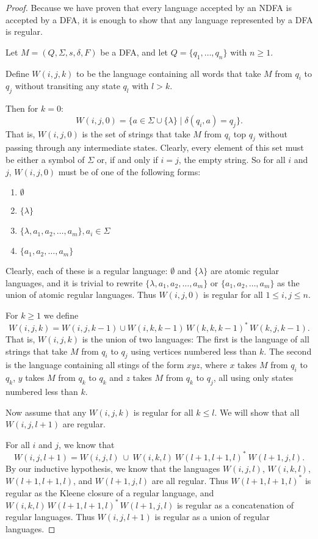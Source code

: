 \documentclass{bcthesis}
\begin{document}
	\begin{proof}
		Because we have proven that every language accepted by an NDFA is accepted by a DFA, it is enough to show that any language represented by a DFA is regular.

		Let $M = (Q, \Sigma, s, \delta, F)$ be a DFA, and let $Q = \{ q_1, \dots, q_n \}$ with $n \geq 1$.

		Define $W(i, j, k)$ to be the language containing all words that take $M$ from $q_i$ to $q_j$ without transiting any state $q_l$ with $l > k$.

		Then for $k = 0$:
		\[
			W(i, j, 0) = \{ a \in \Sigma \cup \{ \lambda \} \mid \delta(q_i, a) = q_j \}.
		\]
		That is, $W(i, j, 0)$ is the set of strings that take $M$ from $q_i$ top $q_j$ without passing through any intermediate states.
		Clearly, every element of this set must be either a symbol of $\Sigma$ or, if and only if $i = j$, the empty string.
		So for all $i$ and $j$, $W(i, j, 0)$ must be of one of the following forms:
		\begin{enumerate}[label=(\roman*), itemsep = -0.3 ex, nolistsep]
			\item $\emptyset$
			\item $\{ \lambda \}$
			\item $\{ \lambda, a_1, a_2, \dots, a_m \}, a_i \in \Sigma$
			\item $\{ a_1, a_2, \dots, a_m \}$
		\end{enumerate}
		Clearly, each of these is a regular language:
		$\emptyset$ and $\{ \lambda \}$ are atomic regular languages, and it is trivial to rewrite $\{ \lambda, a_1, a_2, \dots, a_m \}$ or $\{ a_1, a_2, \dots, a_m \}$ as the union of atomic regular languages.
		Thus $W(i, j, 0)$ is regular for all $1 \leq i, j \leq n$.

		For $k \geq 1$ we define
		\[
			W(i, j, k) = W(i, j, k-1) \cup W(i, k, k-1)\, W(k, k, k-1)^*\, W(k, j, k-1).
		\]
		That is, $W(i, j, k)$ is the union of two languages:
		The first is the language of all strings that take $M$ from $q_i$ to $q_j$ using vertices numbered less than $k$.
		The second is the language containing all stings of the form $xyz$, where $x$ takes $M$ from $q_i$ to $q_k$, $y$ takes $M$ from $q_k$ to $q_k$ and $z$ takes $M$ from $q_k$ to $q_j$, all using only states numbered less than $k$.

		Now assume that any $W(i, j, k)$ is regular for all $k \leq l$.
		We will show that all $W(i, j, l+1)$ are regular.

		For all $i$ and $j$, we know that 
		\[
			W(i, j, l+1) = W(i, j, l) \ \cup \ W(i, k, l)\ W(l+1, l+1, l)^* \ W(l+1, j, l).
		\]
		By our inductive hypothesis, we know that the languages $W(i, j, l)$, $W(i, k, l)$, $W(l+1, l+1, l)$, and $W(l+1, j, l)$ are all regular.
		Thus $W(l+1, l+1, l)^*$ is regular as the Kleene closure of a regular language, and $W(i, k, l)\, W(l+1, l+1, l)^*\, W(l+1, j, l)$ is regular as a concatenation of regular languages.
		Thus $W(i, j, l+1)$ is regular as a union of regular languages.
	\end{proof}
	
\end{document}
